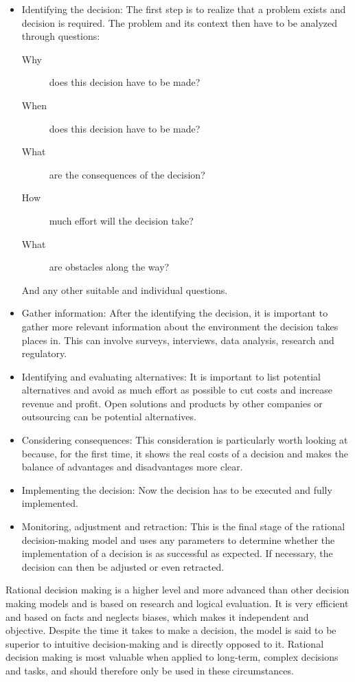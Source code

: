 \begin{itemize}
    \item Identifying the decision: The first step is to realize that a problem exists and decision is required. The problem and its context then have to be analyzed through questions: 
       \begin{description}
         \item[Why] does this decision have to be made?
         \item[When] does this decision have to be made?   
         \item[What] are the consequences of the decision?  
         \item[How] much effort will the decision take? 
         \item[What] are obstacles along the way?
        \end{description}
    And any other suitable and individual questions.
        
    \item Gather information: After the identifying the decision, it is important to gather more relevant information about the environment the decision takes places in. This can involve surveys, interviews, data analysis, research and regulatory.
    \item Identifying and evaluating alternatives: It is important to list potential alternatives and avoid as much effort as possible to cut costs and increase revenue and profit. Open solutions and products by other companies or outsourcing can be potential alternatives.
    \item Considering consequences: This consideration is particularly worth looking at because, for the first time, it shows the real costs of a decision and makes the balance of advantages and disadvantages more clear. 
    \item Implementing the decision: Now the decision has to be executed and fully implemented. 
    \item Monitoring, adjustment and retraction: This is the final stage of the rational decision-making model and uses any parameters to determine whether the implementation of a decision is as successful as expected. If necessary, the decision can then be adjusted or even retracted.
\end{itemize}

\noindent Rational decision making is a higher level and more advanced than other decision making models and is based on research and logical evaluation. It is very efficient and based on facts and neglects biases, which makes it independent and objective. Despite the time it takes to make a decision, the model is said to be superior to intuitive decision-making and is directly opposed to it. Rational decision making is most valuable when applied to long-term, complex decisions and tasks, and should therefore only be used in these circumstances. \cite{uzonwanne_2016}


